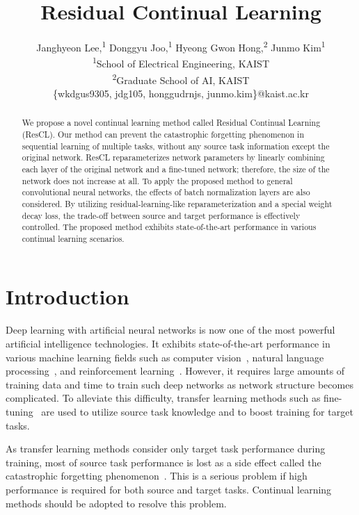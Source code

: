\documentclass[letterpaper]{article}
\title{Residual Continual Learning}
\author{Janghyeon Lee,\textsuperscript{\rm 1} Donggyu Joo,\textsuperscript{\rm 1} Hyeong Gwon Hong,\textsuperscript{\rm 2} Junmo Kim\textsuperscript{\rm 1}\\
\textsuperscript{\rm 1}School of Electrical Engineering, KAIST\\
\textsuperscript{\rm 2}Graduate School of AI, KAIST\\
\{wkdgus9305, jdg105, honggudrnjs, junmo.kim\}@kaist.ac.kr
}
\begin{document}
\maketitle

\begin{abstract}
We propose a novel continual learning method called Residual Continual Learning (ResCL). Our method can prevent the catastrophic forgetting phenomenon in sequential learning of multiple tasks, without any source task information except the original network. ResCL reparameterizes network parameters by linearly combining each layer of the original network and a fine-tuned network; therefore, the size of the network does not increase at all. To apply the proposed method to general convolutional neural networks, the effects of batch normalization layers are also considered. By utilizing residual-learning-like reparameterization and a special weight decay loss, the trade-off between source and target performance is effectively controlled. The proposed method exhibits state-of-the-art performance in various continual learning scenarios.
\end{abstract}

\section{Introduction}


Deep learning with artificial neural networks is now one of the most powerful artificial intelligence technologies. It exhibits state-of-the-art performance in various machine learning fields such as computer vision~\cite{he2016deep}, natural language processing~\cite{wu2016google}, and reinforcement learning~\cite{silver2017mastering}. However, it requires large amounts of training data and time to train such deep networks as network structure becomes complicated. To alleviate this difficulty, transfer learning methods such as fine-tuning~\cite{yosinski2014transferable} are used to utilize source task knowledge and to boost training for target tasks.


As transfer learning methods consider only target task performance during training, most of source task performance is lost as a side effect called the catastrophic forgetting phenomenon~\cite{french1999catastrophic,mccloskey1989catastrophic}. This is a serious problem if high performance is required for both source and target tasks. Continual learning methods should be adopted to resolve this problem.
\end{document}

